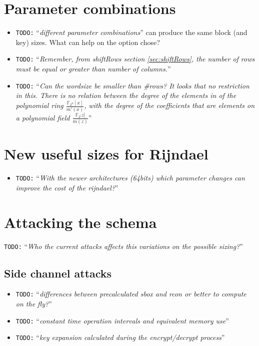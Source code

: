 \documentclass[10pt,a4paper,twoside]{llncs}
\newcommand{\todo}[1]{\texttt{\color{red}TODO:} ``\emph{#1}''}
\newcommand{\Fpn}[2]{\ensuremath{\mathbb{F}_{#1^#2}}}
\begin{document}
\section{Parameter combinations}\label{sec:parameterCombinations}
\begin{itemize}
 \item \todo{different parameter combinations} can produce the same block (and key) sizes. What can help on the option chose?
 \item \todo{Remember, from \emph{shiftRows} section \ref{sec:shiftRows}, the number of rows must be equal or greater than number of columns.}
 \item \todo{Can the wordsize be smaller than \#rows? It looks that no restriction in this. There is no relation between the degree of the elements in of the polynomial ring $\frac{\Fpn{2}{w}[x]}{m'(x)}$, with the degree of the coefficients that are elements on a polynomial field $\frac{\Fpn{2}[z]}{m(z)}$}
\end{itemize}


\section{New useful sizes for Rijndael}\label{sec:newSizes}
\begin{itemize}
 \item \todo{With the newer architectures (64bits) which parameter changes can improve the cost of the rijndael?} \cite{Daemen:1999:EBC:1267115.1267119}
\end{itemize}

\section{Attacking the schema}\label{sec:attacks}

\todo{Who the current attacks affects this variations on the possible sizing?}

\subsection{Side channel attacks}\label{sec:sideChannel}
\begin{itemize}
\item \todo{differences between precalculated sbox and rcon or better to compute on the fly?}\\
\item \todo{constant time operation intervals and equivalent memory use}\\
\item \todo{key expansion calculated during the encrypt/decrypt process}
\end{itemize}
\end{document}
